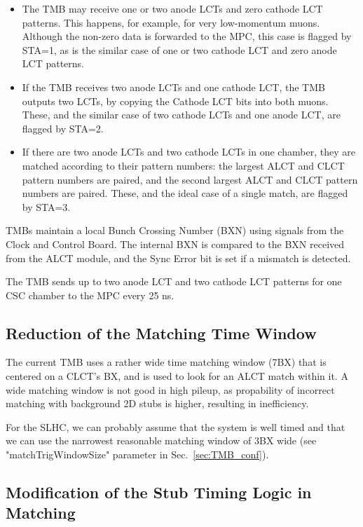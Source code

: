 \begin{itemize}
	\item The TMB may receive one or two anode LCTs and zero cathode LCT patterns. This
happens, for example, for very low-momentum muons. Although the non-zero data is
forwarded to the MPC, this case is flagged by STA=1, as is the similar case of one or two
cathode LCT and zero anode LCT patterns.
	\item If the TMB receives two anode LCTs and one cathode LCT, the TMB outputs two LCTs,
by copying the Cathode LCT bits into both muons. These, and the similar case of two
cathode LCTs and one anode LCT, are flagged by STA=2.
	\item If there are two anode LCTs and two cathode LCTs in one chamber, they are matched
according to their pattern numbers: the largest ALCT and CLCT pattern numbers are
paired, and the second largest ALCT and CLCT pattern numbers are paired. These, and
the ideal case of a single match, are flagged by STA=3.
\end{itemize}

TMBs maintain a local Bunch Crossing Number (BXN) using signals from the Clock
and Control Board. The internal BXN is compared to the BXN received from the ALCT module,
and the Sync Error bit is set if a mismatch is detected.

The TMB sends up to two anode LCT and two cathode LCT patterns for one CSC
chamber to the MPC every 25 ns.

\subsection{Reduction of the Matching Time Window}

The current TMB uses a rather wide time matching window (7BX) that is centered on a CLCT's BX, and is used to look for an ALCT match within it. A wide matching window is not good in high pileup, as propability of incorrect matching with background 2D stubs is higher, resulting in inefficiency.

For the SLHC, we can probably assume that the system is well timed and that we can use the narrowest reasonable matching window of 3BX wide (see "matchTrigWindowSize" parameter in Sec.~\ref{sec:TMB_conf}). 

\subsection{Modification of the Stub Timing Logic in Matching}

